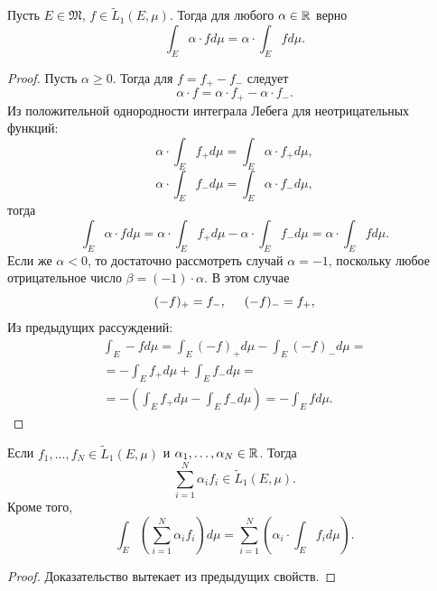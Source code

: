 \begin{statement}
    Пусть $E \in \mathfrak{M}$, $f \in \widetilde{L}_1(E,\mu)$.
    Тогда для любого $\alpha \in \mathbb{R}$ верно
    \[\int_E \alpha \cdot f d\mu = \alpha \cdot \int_E f d\mu.\]
\end{statement} 
\begin{proof}
    Пусть $\alpha \geqslant 0$.
    Тогда для $f = f_+ - f_-$ следует $$\alpha \cdot f = \alpha \cdot f_+ - \alpha \cdot f_-.$$
    Из положительной однородности интеграла Лебега для неотрицательных функций:
    \[\alpha \cdot \int_E f_+ d\mu = \int_E \alpha \cdot f_+ d\mu,\]
    \[\alpha \cdot \int_E f_- d\mu = \int_E \alpha \cdot f_- d\mu,\]
    тогда
    \[\int_E \alpha \cdot f d\mu
    = \alpha \cdot \int_E f_+ d\mu - \alpha \cdot \int_E f_- d\mu
    = \alpha \cdot \int_E f d\mu.\]
    Если же $\alpha < 0$, то достаточно рассмотреть случай $\alpha = -1$, поскольку любое отрицательное число $\beta = (-1) \cdot \alpha$.
    В этом случае
    \[(-f)_+ = f_-, \hspace*{.5cm} (-f)_- = f_+,\]
    Из предыдущих рассуждений:
    \begin{multline*}
    \int_E -f d\mu = \int_E (-f)_+ d\mu - \int_E (-f)_- d\mu
    =\\= - \int_E f_+ d\mu + \int_E f_- d\mu
    =\\= - \left(\int_E f_+ d\mu - \int_E f_- d\mu\right)
    = - \int_E f d\mu.
    \end{multline*} 
\end{proof} 

\begin{statement}
    Если $f_1, \dots, f_N \in \widetilde{L}_1(E, \mu)$ и $\alpha_1, \dots, \alpha_N \in \mathbb{R}$.
    Тогда
    \[\sum\limits_{i=1}^{N} \alpha_i f_i \in \widetilde{L}_1(E, \mu).\]
    Кроме того,
    \[\int_E \left(\sum\limits_{i=1}^{N} \alpha_i f_i\right) d\mu = \sum\limits_{i=1}^{N} \left(\alpha_i \cdot \int_E f_i d\mu\right).\]
\end{statement} 
\begin{proof}
    Доказательство вытекает из предыдущих свойств.
\end{proof} 